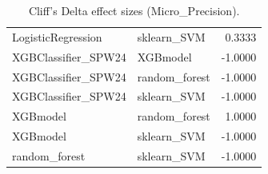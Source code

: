 \begin{table}[t]
\begin{tabular}{llr}
LogisticRegression & sklearn_SVM & 0.3333 \\
XGBClassifier_SPW24 & XGBmodel & -1.0000 \\
XGBClassifier_SPW24 & random_forest & -1.0000 \\
XGBClassifier_SPW24 & sklearn_SVM & -1.0000 \\
XGBmodel & random_forest & 1.0000 \\
XGBmodel & sklearn_SVM & -1.0000 \\
random_forest & sklearn_SVM & -1.0000 \\
\bottomrule
\end{tabular}
\caption{Cliff's Delta effect sizes (Micro_Precision).}
\label{tab:cliffs_Micro_Precision}
\end{table}